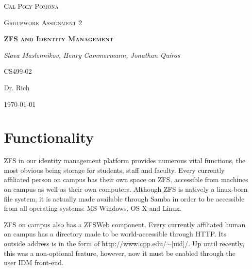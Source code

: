 \documentclass[letterpaper,12pt,titlepage]{article}
\date{Monday, March 7th 2016}
\author{Slava Maslennikov \and Henry Ammermann \and Jonathan Quiros}
\begin{document}

\begin{titlepage}
\centering
{\scshape\LARGE Cal Poly Pomona\par}
\vspace{1cm}
{\scshape\Large Groupwork Assignment 2\par}
\vspace{1.5cm}
{\scshape\bfseries ZFS and Identity Management\par}
\vspace{2cm}
{\Large\itshape Slava Maslennikov, Henry Cammermann, Jonathan Quiros\par}
\vfill
CS499-02\par
Dr. Rich
\vfill
{\large \today\par}
\end{titlepage}

\tableofcontents

%

\section{Functionality}
ZFS in our identity management platform provides numerous vital functions, the most obvious being storage for students, staff and faculty. Every currently affiliated person on campus has their own space on ZFS, accessible from machines on campus as well as their own computers. Although ZFS is natively a linux-born file system, it is actually made available through Samba in order to be accessible from all operating systems: MS Windows, OS X and Linux. 

ZFS on campus also has a ZFSWeb component. Every currently affiliated human on campus has a directory made to be world-accessible through HTTP. Its outside address is in the form of http://www.cpp.edu/$\sim$[uid]/. Up until recently, this was a non-optional feature, however, now it must be enabled through the user IDM front-end.

\end{document}
